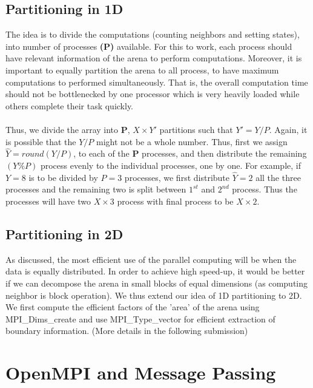 \documentclass[a4paper, 10pt, conference]{IEEEtran}      %
\begin{document}
	\subsection{Partitioning in 1D}
	
	The idea is to divide the computations (counting neighbors and setting states), into number of processes \textbf{(P)} available. For this to work, each process should have relevant information of the arena to perform computations. Moreover, it is important to equally partition the arena to all process, to have maximum computations to performed simultaneously. That is, the overall computation time should not be bottlenecked by one processor which is very heavily loaded while others complete their task quickly.\\\\
	
	Thus, we divide the array into \textbf{P},  $X \times Y'$  partitions such that $ Y' = Y/P$. Again, it is possible that the $Y/P$ might not be a whole number. Thus, first we assign $ \hat{Y} = round(Y/P)$, to each of the \textbf{P} processes, and then distribute the remaining $(Y \% P)$ process evenly to the individual processes, one by one. For example, if $Y = 8$ is to be divided by $P = 3$ processes, we first distribute $\hat{Y} = 2$ all the three processes and the remaining two is split between $1^{st}$ and $2^{nd}$ process. Thus the processes will have two $X \times 3$ process with final process to be $X \times 2$.
	
	\subsection{Partitioning in 2D}
	
	As discussed, the most efficient use of the parallel computing will be when the data is equally distributed. In order to achieve high speed-up, it would be better if we can decompose the arena in small blocks of equal dimensions (as computing neighbor is block operation). We thus extend our idea of 1D partitioning to 2D. We first compute the efficient factors of the 'area' of the arena using MPI\_Dims\_create and use MPI\_Type\_vector for efficient extraction of boundary information.
	(More details in the following submission)
	
	\section{OpenMPI and Message Passing}
	
\end{document}
